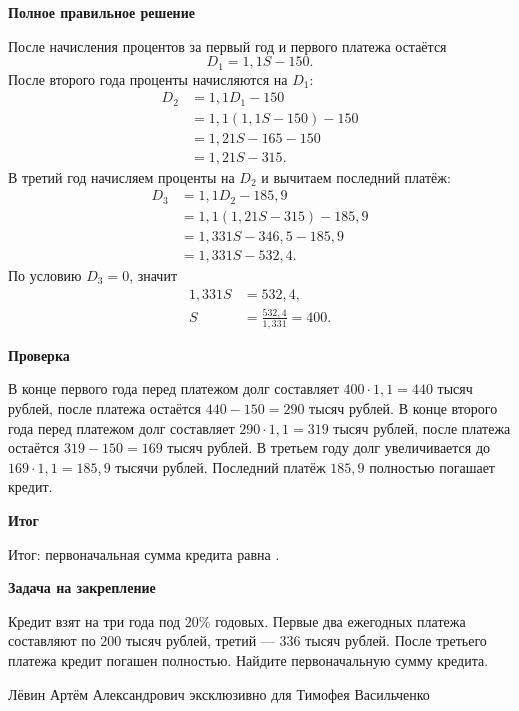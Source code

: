 \documentclass[12pt,a4paper]{article}
\newcommand{\subpart}[1]{\par\medskip\noindent\textbf{#1}\par\nobreak\smallskip}
\newcommand{\rate}{\text{ тыс. руб.}}
\begin{document}
\subpart{Полное правильное решение}
После начисления процентов за первый год и первого платежа остаётся
\[
D_1=1{,}1S-150.
\]
После второго года проценты начисляются на $D_1$:
\begin{align*}
D_2&=1{,}1D_1-150\\
   &=1{,}1(1{,}1S-150)-150\\
   &=1{,}21S-165-150\\
   &=1{,}21S-315.
\end{align*}
В третий год начисляем проценты на $D_2$ и вычитаем последний платёж:
\begin{align*}
D_3&=1{,}1D_2-185{,}9\\
   &=1{,}1(1{,}21S-315)-185{,}9\\
   &=1{,}331S-346{,}5-185{,}9\\
   &=1{,}331S-532{,}4.
\end{align*}
По условию $D_3=0$, значит
\begin{align*}
1{,}331S&=532{,}4,\\
S&=\frac{532{,}4}{1{,}331}=400.
\end{align*}

\subpart{Проверка}
В конце первого года перед платежом долг составляет
$400\cdot1{,}1=440$ тысяч рублей, после платежа остаётся
$440-150=290$ тысяч рублей.
В конце второго года перед платежом долг составляет
$290\cdot1{,}1=319$ тысяч рублей, после платежа остаётся
$319-150=169$ тысяч рублей.
В третьем году долг увеличивается до $169\cdot1{,}1=185{,}9$
тысячи рублей. Последний платёж $185{,}9$ полностью погашает кредит.

\subpart{Итог}
\textcolor{teal!60!black}{Итог:} первоначальная сумма кредита равна
\boxed{400\rate}.

\subpart{Задача на закрепление}
Кредит взят на три года под $20\%$ годовых. Первые два ежегодных
платежа составляют по $200$ тысяч рублей, третий --- $336$ тысяч рублей.
После третьего платежа кредит погашен полностью.
Найдите первоначальную сумму кредита.

\par\vfill
\begin{center}
\footnotesize Лёвин Артём Александрович эксклюзивно для Тимофея Васильченко
\end{center}
\end{document}
